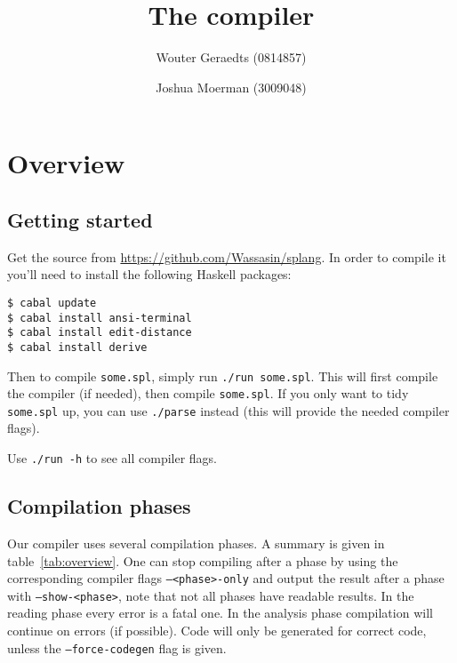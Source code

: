 \documentclass[14pt]{amsart}
\title{The \splang compiler}
\author{Wouter Geraedts (0814857) \and Joshua Moerman (3009048)}
\date{}
\newcommand{\flag}[1]{\texttt{#1}}
\begin{document}
\maketitle

\tableofcontents

\section{Overview}
\subsection{Getting started}
Get the source from \url{https://github.com/Wassasin/splang}. In order to compile it you'll need to install the following Haskell packages:
\begin{lstlisting}
$ cabal update
$ cabal install ansi-terminal
$ cabal install edit-distance
$ cabal install derive
\end{lstlisting}

Then to compile \texttt{some.spl}, simply run \texttt{./run some.spl}. This will first compile the compiler (if needed), then compile \texttt{some.spl}. If you only want to tidy \texttt{some.spl} up, you can use \texttt{./parse} instead (this will provide the needed compiler flags).

Use \texttt{./run -h} to see all compiler flags.

\subsection{Compilation phases}
Our compiler uses several compilation phases. A summary is given in table~\ref{tab:overview}. One can stop compiling after a phase by using the corresponding compiler flags \flag{--<phase>-only} and output the result after a phase with \flag{--show-<phase>}, note that not all phases have readable results. In the reading phase every error is a fatal one. In the analysis phase compilation will continue on errors (if possible). Code will only be generated for correct code, unless the \flag{--force-codegen} flag is given.
\end{document}
